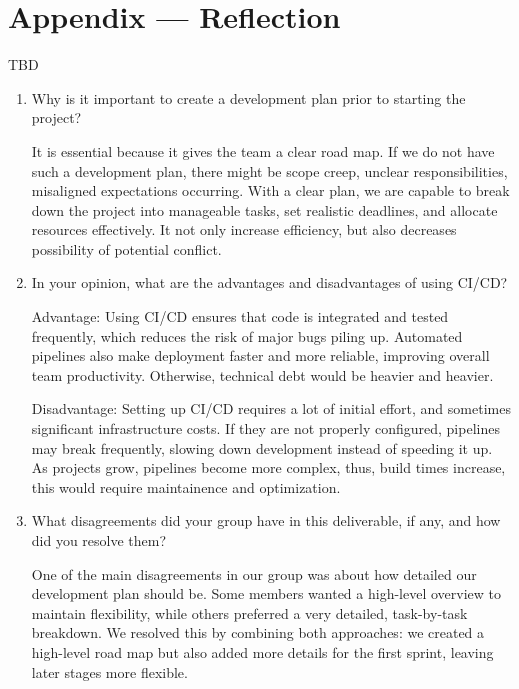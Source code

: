\documentclass{article}
\begin{document}
\newpage{}

\section*{Appendix --- Reflection}
{\color{red} TBD}




\begin{enumerate}
    \item Why is it important to create a development plan prior to starting the
    project?

    It is essential because it gives the team a clear road map. If we do not have such a development plan, there might be scope creep, unclear responsibilities, misaligned expectations occurring. With a clear plan, we are capable to break down the project into manageable tasks, set realistic deadlines, and allocate resources effectively. It not only increase efficiency, but also decreases possibility of potential conflict.
    \item In your opinion, what are the advantages and disadvantages of using
    CI/CD?

    Advantage: Using CI/CD ensures that code is integrated and tested frequently, which reduces the risk of major bugs piling up. Automated pipelines also make deployment faster and more reliable, improving overall team productivity. Otherwise, technical debt would be heavier and heavier.

    Disadvantage: Setting up CI/CD requires a lot of initial effort, and sometimes significant infrastructure costs. If they are not properly configured, pipelines may break frequently, slowing down development instead of speeding it up. As projects grow, pipelines become more complex, thus, build times increase, this would require maintainence and optimization.
    \item What disagreements did your group have in this deliverable, if any,
    and how did you resolve them?

    One of the main disagreements in our group was about how detailed our development plan should be. Some members wanted a high-level overview to maintain flexibility, while others preferred a very detailed, task-by-task breakdown. We resolved this by combining both approaches: we created a high-level road map but also added more details for the first sprint, leaving later stages more flexible.

\end{enumerate}
\end{document}
